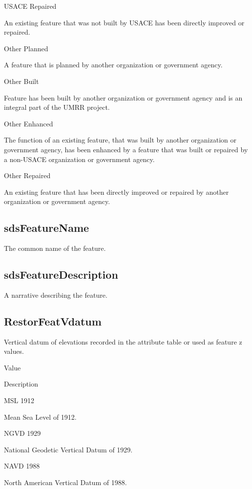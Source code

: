 \documentclass[
  letterpaper,
  DIV=11,
  numbers=noendperiod]{scrreprt}
\begin{document}
USACE Repaired

An existing feature that was not built by USACE has been directly
improved or repaired.

Other Planned

A feature that is planned by another organization or government agency.

Other Built

Feature has been built by another organization or government agency and
is an integral part of the UMRR project.

Other Enhanced

The function of an existing feature, that was built by another
organization or government agency, has been enhanced by a feature that
was built or repaired by a non-USACE organization or government agency.

Other Repaired

An existing feature that has been directly improved or repaired by
another organization or government agency.

\subsection{sdsFeatureName}\label{sdsfeaturename-10}

The common name of the feature.

\subsection{sdsFeatureDescription}\label{sdsfeaturedescription-10}

A narrative describing the feature.

\subsection{RestorFeatVdatum}\label{restorfeatvdatum-10}

Vertical datum of elevations recorded in the attribute table or used as
feature z values.

Value

Description

MSL 1912

Mean Sea Level of 1912.

NGVD 1929

National Geodetic Vertical Datum of 1929.

NAVD 1988

North American Vertical Datum of 1988.
\end{document}
